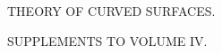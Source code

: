 %
\begin{center}
\vspace*{2in}
{\Large THEORY OF CURVED SURFACES.\par}
\vspace{1cm}
SUPPLEMENTS TO VOLUME IV.
\end{center}
\clearpage
